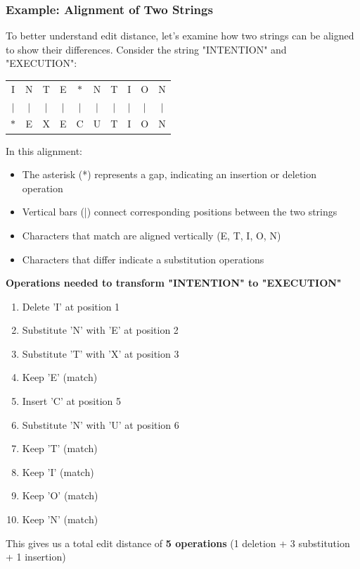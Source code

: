 \documentclass[a4paper]{article}
\theoremstyle{definition}
\begin{document}
\subsubsection{Example: Alignment of Two Strings}
To better understand edit distance, let's examine how two strings can be aligned to show their differences.
Consider the string "INTENTION" and "EXECUTION":
\begin{center}
  \setlength{\tabcolsep}{7pt}   %
  \begin{tabular}{*{10}{c}}
    I & N & T & E & $*$ & N & T & I & O & N \\
    $|$ & $|$ & $|$ & $|$ & $|$ & $|$ & $|$ & $|$ & $|$ & $|$ \\
    $*$ & E & X & E & C & U & T & I & O & N
  \end{tabular}
\end{center}
In this alignment:
\begin{itemize}
  \item The asterisk (*) represents a gap, indicating an insertion or deletion operation 
  \item Vertical bars (|) connect corresponding positions between the two strings 
  \item Characters that match are aligned vertically (E, T, I, O, N)
  \item Characters that differ indicate a substitution operations
\end{itemize}
\textbf{Operations needed to transform "INTENTION" to "EXECUTION"}
\begin{enumerate}
  \item Delete 'I' at position 1 
  \item Substitute 'N' with 'E' at position 2 
  \item Substitute 'T' with 'X' at position 3
  \item Keep 'E' (match)
  \item Insert 'C' at position 5
  \item Substitute 'N' with 'U' at position 6 
  \item Keep 'T' (match)
  \item Keep 'I' (match)
  \item Keep 'O' (match)
  \item Keep 'N' (match)
\end{enumerate}
This gives us a total edit distance of \textbf{5 operations} (1 deletion + 3 substitution + 1 insertion)
\end{document}
